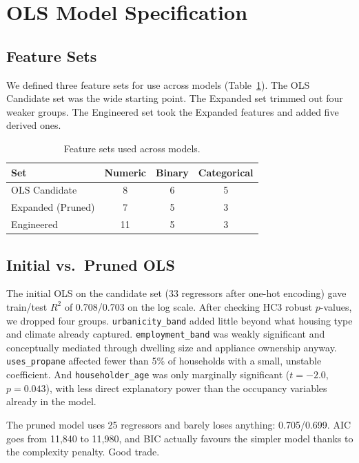 \documentclass[10pt,twocolumn]{article}
\begin{document}
\section{OLS Model Specification}

\subsection{Feature Sets}

We defined three feature sets for use across models (Table~\ref{tab:fsets}). The OLS Candidate set was the wide starting point. The Expanded set trimmed out four weaker groups. The Engineered set took the Expanded features and added five derived ones.

\begin{table}[H]
\centering
\caption{Feature sets used across models.}
\label{tab:fsets}
\small
\begin{tabular}{@{}lccc@{}}
\toprule
\textbf{Set} & \textbf{Numeric} & \textbf{Binary} & \textbf{Categorical}\\
\midrule
OLS Candidate & 8 & 6 & 5\\
Expanded (Pruned) & 7 & 5 & 3\\
Engineered & 11 & 5 & 3\\
\bottomrule
\end{tabular}
\end{table}

\subsection{Initial vs.\ Pruned OLS}

The initial OLS on the candidate set (33 regressors after one-hot encoding) gave train/test $R^2$ of 0.708/0.703 on the log scale. After checking HC3 robust $p$-values, we dropped four groups. \texttt{urbanicity\_band} added little beyond what housing type and climate already captured. \texttt{employment\_band} was weakly significant and conceptually mediated through dwelling size and appliance ownership anyway. \texttt{uses\_propane} affected fewer than 5\% of households with a small, unstable coefficient. And \texttt{householder\_age} was only marginally significant ($t = -2.0$, $p = 0.043$), with less direct explanatory power than the occupancy variables already in the model.

The pruned model uses 25 regressors and barely loses anything: 0.705/0.699. AIC goes from 11{,}840 to 11{,}980, and BIC actually favours the simpler model thanks to the complexity penalty. Good trade.
\end{document}
